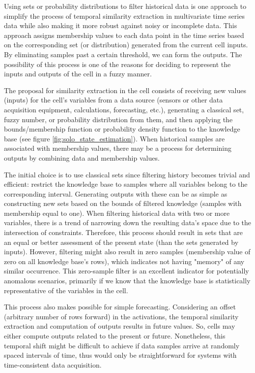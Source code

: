 Using sets or probability distributions to filter historical data is one approach to simplify the process of temporal similarity extraction in multivariate time series data while also making it more robust against noisy or incomplete data. This approach assigns membership values to each data point in the time series based on the corresponding set (or distribution) generated from the current cell inputs. By eliminating samples past a certain threshold, we can form the outputs. The possibility of this process is one of the reasons for deciding to represent the inputs and outputs of the cell in a fuzzy manner. 

The proposal for similarity extraction in the cell consists of receiving new values (inputs) for the cell's variables from a data source (sensors or other data acquisition equipment, calculations, forecasting, etc.), generating a classical set, fuzzy number, or probability distribution from them, and then applying the bounds/membership function or probability density function to the knowledge base (see figure \ref{fig:solo_state_estimation}). When historical samples are associated with membership values, there may be a process for determining outputs by combining data and membership values.

The initial choice is to use classical sets since filtering history becomes trivial and efficient: restrict the knowledge base to samples where all variables belong to the corresponding interval. Generating outputs with these can be as simple as constructing new sets based on the bounds of filtered knowledge (samples with membership equal to one). When filtering historical data with two or more variables, there is a trend of narrowing down the resulting data's space due to the intersection of constraints. Therefore, this process should result in sets that are an equal or better assessment of the present state (than the sets generated by inputs). However, filtering might also result in zero samples (membership value of zero on all knowledge base's rows), which indicates not having "memory" of any similar occurrence. This zero-sample filter is an excellent indicator for potentially anomalous scenarios, primarily if we know that the knowledge base is statistically representative of the variables in the cell.

This process also makes possible for simple forecasting. Considering an offset (arbitrary number of rows forward) in the activations, the temporal similarity extraction and computation of outputs results in future values. So, cells may either compute outputs related to the present or future. Nonetheless, this temporal shift might be difficult to achieve if data samples arrive at randomly spaced intervals of time, thus would only be straightforward for systems with time-consistent data acquisition.

